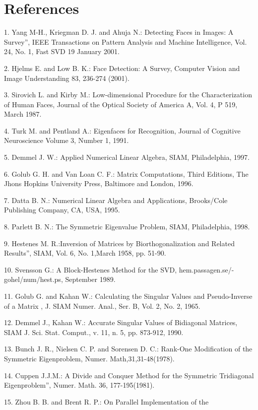 \section{References}
1. Yang M-H., Kriegman D. J. and Ahuja N.: Detecting Faces in Images: A Survey”,
IEEE Transactions on Pattern Analysis and Machine Intelligence, Vol. 24, No. 1,
Fast SVD 19
January 2001.\par
2. Hjelms E. and Low B. K.: Face Detection: A Survey, Computer Vision and Image
Understanding 83, 236-274 (2001).\par
3. Sirovich L. and Kirby M.: Low-dimensional Procedure for the Characterization of
Human Faces, Journal of the Optical Society of America A, Vol. 4, P 519, March
1987.\par
4. Turk M. and Pentland A.: Eigenfaces for Recognition, Journal of Cognitive Neuroscience
Volume 3, Number 1, 1991.\par
5. Demmel J. W.: Applied Numerical Linear Algebra, SIAM, Philadelphia, 1997.\par
6. Golub G. H. and Van Loan C. F.: Matrix Computations, Third Editions, The
Jhons Hopkins University Press, Baltimore and London, 1996.\par
7. Datta B. N.: Numerical Linear Algebra and Applications, Brooks/Cole Publishing
Company, CA, USA, 1995.\par
8. Parlett B. N.: The Symmetric Eigenvalue Problem, SIAM, Philadelphia, 1998.\par
9. Hestenes M. R.:Inversion of Matrices by Biorthogonalization and Related Results”,
SIAM, Vol. 6, No. 1,March 1958, pp. 51-90.\par
10. Svensson G.: A Block-Hestenes Method for the SVD, hem.passagen.se/-
gohel/num/hest.ps, September 1989.\par
11. Golub G. and Kahan W.: Calculating the Singular Values and Pseudo-Inverse of
a Matrix , J. SIAM Numer. Anal., Ser. B, Vol. 2, No. 2, 1965.\par
12. Demmel J., Kahan W.: Accurate Singular Values of Bidiagonal Matrices, SIAM J.
Sci. Stat. Comput., v. 11, n. 5, pp. 873-912, 1990.\par
13. Bunch J. R., Nielsen C. P. and Sorensen D. C.: Rank-One Modification of the
Symmetric Eigenproblem, Numer. Math,31,31-48(1978).\par
14. Cuppen J.J.M.: A Divide and Conquer Method for the Symmetric Tridiagonal
Eigenproblem”, Numer. Math. 36, 177-195(1981).\par
15. Zhou B. B. and Brent R. P.: On Parallel Implementation of the

